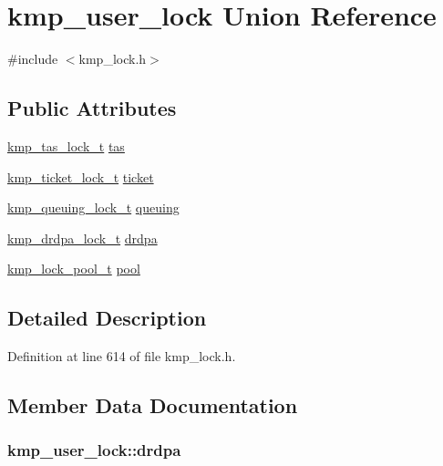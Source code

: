 \hypertarget{unionkmp__user__lock}{\section{kmp\-\_\-user\-\_\-lock Union Reference}
\label{unionkmp__user__lock}
}


{\ttfamily \#include $<$kmp\-\_\-lock.\-h$>$}

\subsection*{Public Attributes}
\begin{DoxyCompactItemize}
\item 
\hyperlink{kmp__lock_8h_ad7fed30e73035fc66ab6d2c83d310853}{kmp\-\_\-tas\-\_\-lock\-\_\-t} \hyperlink{unionkmp__user__lock_ac0b526819ee392b205697ed5786ccf3f}{tas}
\item 
\hyperlink{kmp__lock_8h_a4b61b6951ad864c4ce5019d331ad3c4c}{kmp\-\_\-ticket\-\_\-lock\-\_\-t} \hyperlink{unionkmp__user__lock_a92265fa873dccf540063d31fd19030ae}{ticket}
\item 
\hyperlink{kmp__lock_8h_afddb88c8dc45b091f6a602c7b4193a6c}{kmp\-\_\-queuing\-\_\-lock\-\_\-t} \hyperlink{unionkmp__user__lock_a62045237fa09ff640f05e05347e7757e}{queuing}
\item 
\hyperlink{kmp__lock_8h_aad008579fd6a362c2a1360d20945d5fe}{kmp\-\_\-drdpa\-\_\-lock\-\_\-t} \hyperlink{unionkmp__user__lock_aa31483e59e6c3c8f94e2352ab660a893}{drdpa}
\item 
\hyperlink{kmp__lock_8h_a467f5477f4f5397ebd24a94c85922744}{kmp\-\_\-lock\-\_\-pool\-\_\-t} \hyperlink{unionkmp__user__lock_adda8ec585d9625951bb781831fb3f3b3}{pool}
\end{DoxyCompactItemize}


\subsection{Detailed Description}


Definition at line 614 of file kmp\-\_\-lock.\-h.



\subsection{Member Data Documentation}
\hypertarget{unionkmp__user__lock_aa31483e59e6c3c8f94e2352ab660a893}{
\subsubsection[{drdpa}]{ kmp\-\_\-user\-\_\-lock\-::drdpa}}\label{unionkmp__user__lock_aa31483e59e6c3c8f94e2352ab660a893}


